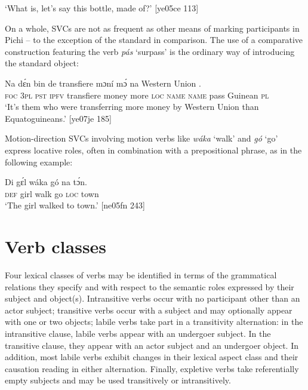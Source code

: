 \glt ‘What is, let’s say this bottle, made of?’ [ye05ce 113]
\z

On a whole, SVCs are not as frequent as other means of marking participants in Pichi – to the exception of the standard in comparison. The use of a comparative construction featuring the verb \textit{pás} ‘surpass’ is the ordinary way of introducing the standard object:


\ea%
    \label{ex:key:1078}
    \gll Na  dɛ́n  bin  de  transfiere  mɔní  mɔ́    na  Western  Union
    .\\
\textsc{foc}  \textsc{3pl}  \textsc{pst}  \textsc{ipfv}  transfiere  money  more  \textsc{loc}  \textsc{name}  \textsc{name}
pass  Guinean    \textsc{pl}\\
\glt ‘It’s them who were transferring more money by Western Union
than Equatoguineans.’ [ye07je 185]
\z

Motion-direction SVCs involving motion verbs like \textit{wáka} ‘walk’ and \textit{gó} ‘go’ express locative roles, often in combination with a prepositional phrase, as in the following example: 


\ea%
    \label{ex:key:1079}
    \gll Di  gɛ́l    wáka  gó  na  tɔ́n.\\
\textsc{def}  girl    walk  go  \textsc{loc}  town\\

\glt ‘The girl walked to town.’ [ne05fn 243]
\z

\section{Verb classes}\label{sec:9.2}

Four lexical classes of verbs may be identified in terms of the grammatical relations they specify and with respect to the semantic roles expressed by their subject and object(s). Intransitive verbs occur with no participant other than an actor subject; transitive verbs occur with a subject and may optionally appear with one or two objects; labile verbs take part in a transitivity alternation: in the intransitive clause, labile verbs appear with an undergoer subject. In the transitive clause, they appear with an actor subject and an undergoer object. In addition, most labile verbs exhibit changes in their lexical aspect class and their causation reading in either alternation. Finally, expletive verbs take referentially empty subjects and may be used transitively or intransitively.


